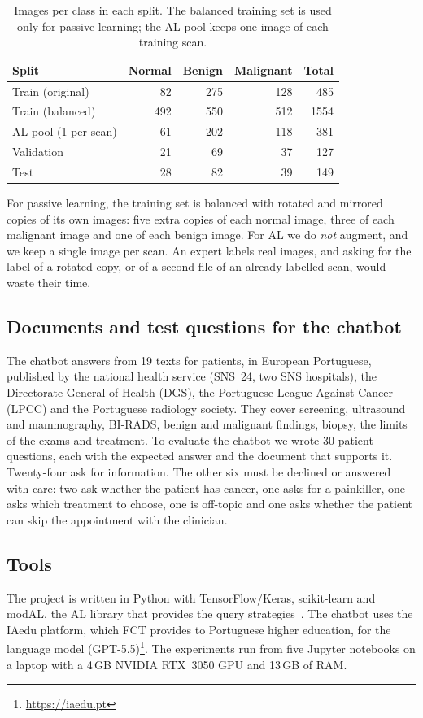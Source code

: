 \documentclass{article}
\begin{document}
\begin{table}[t]
\centering
\small
\begin{tabular}{lrrrr}
\toprule
Split & Normal & Benign & Malignant & Total \\
\midrule
Train (original)   & 82  & 275 & 128 & 485 \\
Train (balanced)   & 492 & 550 & 512 & 1554 \\
AL pool (1 per scan) & 61 & 202 & 118 & 381 \\
Validation            & 21  & 69  & 37  & 127 \\
Test                  & 28  & 82  & 39  & 149 \\
\bottomrule
\end{tabular}
\caption{Images per class in each split. The balanced training set is used only for
passive learning; the AL pool keeps one image of each training scan.}
\label{tab:splits}
\end{table}

For passive learning, the training set is balanced with rotated and mirrored copies of its
own images: five extra copies of each normal image, three of each malignant image and one
of each benign image. For AL we do \emph{not} augment, and we keep a single image per scan.
An expert labels real images, and asking for the label of a rotated copy, or of a second
file of an already-labelled scan, would waste their time.

\subsection{Documents and test questions for the chatbot}
The chatbot answers from 19 texts for patients, in European Portuguese, published by the
national health service (SNS~24, two SNS hospitals), the Directorate-General of Health
(DGS), the Portuguese League Against Cancer (LPCC) and the Portuguese radiology society.
They cover screening, ultrasound and mammography, BI-RADS, benign and malignant findings,
biopsy, the limits of the exams and treatment. To evaluate the chatbot we wrote 30 patient
questions, each with the expected answer and the document that supports it. Twenty-four
ask for information. The other six must be declined or answered with care: two ask whether
the patient has cancer, one asks for a painkiller, one asks which treatment to choose, one
is off-topic and one asks whether the patient can skip the appointment with the clinician.

\subsection{Tools}
The project is written in Python with TensorFlow/Keras, scikit-learn and modAL, the AL
library that provides the query strategies~\cite{danka2018modal}. The chatbot uses the IAedu
platform, which FCT provides to Portuguese higher education, for the language model
(GPT-5.5)\footnote{\url{https://iaedu.pt}}. The experiments run from five Jupyter
notebooks on a laptop with a 4\,GB NVIDIA RTX~3050 GPU and 13\,GB of RAM.
\end{document}
